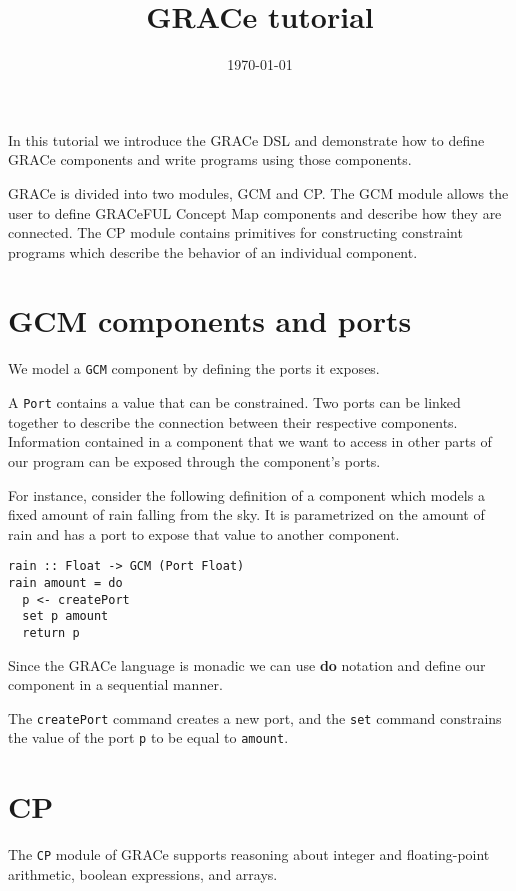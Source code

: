 \documentclass[a4paper]{article}
\title{GRACe tutorial}
\author{}
\date{\today}
\begin{document}
\maketitle

In this tutorial we introduce the GRACe DSL and demonstrate how to define
GRACe components and write programs using those components.

GRACe is divided into two modules, GCM and CP. The GCM module allows the user
to define GRACeFUL Concept Map components and describe how they are connected.
The CP module contains primitives for constructing constraint programs which
describe the behavior of an individual component.

\section{GCM components and ports}
We model a \texttt{GCM} component by defining the ports it exposes.

A \texttt{Port} contains a value that can be constrained.
Two ports can be linked together to describe the connection between their
respective components.
Information contained in a component that we want to access in other parts
of our program can be exposed through the component's ports.

For instance, consider the following definition of a component which models
a fixed amount of rain falling from the sky.
It is parametrized on the amount of rain and has a port to expose that value
to another component.
\begin{verbatim}
rain :: Float -> GCM (Port Float)
rain amount = do
  p <- createPort
  set p amount
  return p
\end{verbatim}
Since the GRACe language is monadic we can use \textbf{do} notation and define our
component in a sequential manner.

The \texttt{createPort} command creates a new port, and the \texttt{set} command
constrains the value of the port \texttt{p} to be equal to \texttt{amount}.

\section{CP}
The \texttt{CP} module of GRACe supports reasoning about integer and floating-point arithmetic,
boolean expressions, and arrays.
\end{document}
